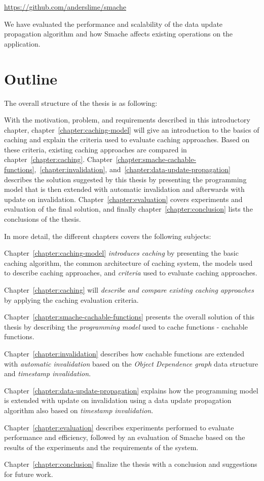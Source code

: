 \url{https://github.com/anderslime/smache}

We have evaluated the performance and scalability of the data update propagation algorithm and how Smache affects existing operations on the application.

\section{Outline}
\label{sec:outline}

The overall structure of the thesis is as following:

With the motivation, problem, and requirements described in this introductory chapter, chapter~\ref{chapter:caching-model} will give an introduction to the basics of caching and explain the criteria used to evaluate caching approaches. Based on these criteria, existing caching approaches are compared in chapter~\ref{chapter:caching}. Chapter~\ref{chapter:smache-cachable-functions},~\ref{chapter:invalidation}, and~\ref{chapter:data-update-propagation} describes the solution suggested by this thesis by presenting the programming model that is then extended with automatic invalidation and afterwards with update on invalidation. Chapter~\ref{chapter:evaluation} covers experiments and evaluation of the final solution, and finally chapter~\ref{chapter:conclusion} lists the conclusions of the thesis.

In more detail, the different chapters covers the following subjects:

Chapter~\ref{chapter:caching-model} \emph{introduces caching} by presenting the basic caching algorithm, the common architecture of caching system, the models used to describe caching approaches, and \emph{criteria} used to evaluate caching approaches.

Chapter~\ref{chapter:caching} will \emph{describe and compare existing caching approaches} by applying the caching evaluation criteria.

Chapter~\ref{chapter:smache-cachable-functions} presents the overall solution of this thesis by describing the \emph{programming model} used to cache functions - cachable functions.

Chapter~\ref{chapter:invalidation} describes how cachable functions are extended with \emph{automatic invalidation} based on the \emph{Object Dependence graph} data structure and \emph{timestamp invalidation}.

Chapter~\ref{chapter:data-update-propagation} explains how the programming model is extended with update on invalidation using a data update propagation algorithm also based on \emph{timestamp invalidation}.

Chapter~\ref{chapter:evaluation} describes experiments performed to evaluate performance and efficiency, followed by an evaluation of Smache based on the results of the experiments and the requirements of the system.

Chapter~\ref{chapter:conclusion} finalize the thesis with a conclusion and suggestions for future work.




